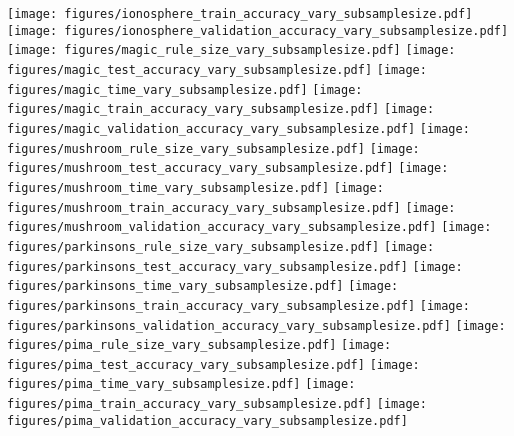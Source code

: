 \begin{figure*}
	\texttt{[image: figures/ionosphere\_train\_accuracy\_vary\_subsamplesize.pdf]}
	\texttt{[image: figures/ionosphere\_validation\_accuracy\_vary\_subsamplesize.pdf]}
	\texttt{[image: figures/magic\_rule\_size\_vary\_subsamplesize.pdf]}
	\texttt{[image: figures/magic\_test\_accuracy\_vary\_subsamplesize.pdf]}
	\texttt{[image: figures/magic\_time\_vary\_subsamplesize.pdf]}
	\texttt{[image: figures/magic\_train\_accuracy\_vary\_subsamplesize.pdf]}
	\texttt{[image: figures/magic\_validation\_accuracy\_vary\_subsamplesize.pdf]}
	\texttt{[image: figures/mushroom\_rule\_size\_vary\_subsamplesize.pdf]}
	\texttt{[image: figures/mushroom\_test\_accuracy\_vary\_subsamplesize.pdf]}
	\texttt{[image: figures/mushroom\_time\_vary\_subsamplesize.pdf]}
	\texttt{[image: figures/mushroom\_train\_accuracy\_vary\_subsamplesize.pdf]}
	\texttt{[image: figures/mushroom\_validation\_accuracy\_vary\_subsamplesize.pdf]}
	\texttt{[image: figures/parkinsons\_rule\_size\_vary\_subsamplesize.pdf]}
	\texttt{[image: figures/parkinsons\_test\_accuracy\_vary\_subsamplesize.pdf]}
	\texttt{[image: figures/parkinsons\_time\_vary\_subsamplesize.pdf]}
	\texttt{[image: figures/parkinsons\_train\_accuracy\_vary\_subsamplesize.pdf]}
	\texttt{[image: figures/parkinsons\_validation\_accuracy\_vary\_subsamplesize.pdf]}
	\texttt{[image: figures/pima\_rule\_size\_vary\_subsamplesize.pdf]}
	\texttt{[image: figures/pima\_test\_accuracy\_vary\_subsamplesize.pdf]}
	\texttt{[image: figures/pima\_time\_vary\_subsamplesize.pdf]}
	\texttt{[image: figures/pima\_train\_accuracy\_vary\_subsamplesize.pdf]}
	\texttt{[image: figures/pima\_validation\_accuracy\_vary\_subsamplesize.pdf]}
	
	\end{figure*}
	
